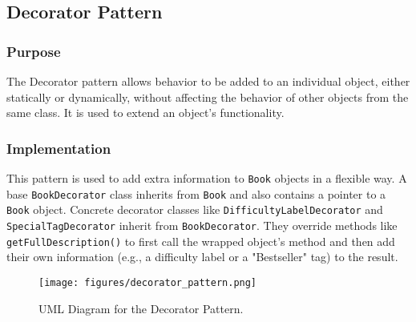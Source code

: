 \subsection{Decorator Pattern}
\subsubsection{Purpose}
The Decorator pattern allows behavior to be added to an individual object, either statically or dynamically, without affecting the behavior of other objects from the same class. It is used to extend an object's functionality.

\subsubsection{Implementation}
This pattern is used to add extra information to \texttt{Book} objects in a flexible way. A base \texttt{BookDecorator} class inherits from \texttt{Book} and also contains a pointer to a \texttt{Book} object. Concrete decorator classes like \texttt{DifficultyLabelDecorator} and \texttt{SpecialTagDecorator} inherit from \texttt{BookDecorator}. They override methods like \texttt{getFullDescription()} to first call the wrapped object's method and then add their own information (e.g., a difficulty label or a "Bestseller" tag) to the result.

\begin{figure}[H]
    \centering
    \texttt{[image: figures/decorator\_pattern.png]}
    \caption{UML Diagram for the Decorator Pattern.}
    \label{fig:decorator_pattern}
\end{figure}